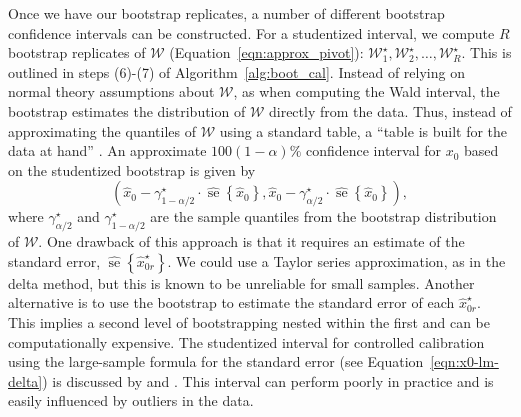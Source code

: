 \documentclass[cmfont,usenames,dvipsnames,leqno]{afit-etd}\usepackage[]{graphicx}\usepackage[]{color}
\newcommand{\boot}{\star} %
\newcommand{\mc}[1]{\ensuremath{\mathcal{#1}}}
\newcommand{\wh}[1]{\ensuremath{\widehat{#1}}}
\newcommand{\se}{\operatorname{se}}
\begin{document}
Once we have our bootstrap replicates, a number of different bootstrap confidence intervals can be constructed. For a studentized interval, we compute $R$ bootstrap replicates of $\mc{W}$ (Equation~\eqref{eqn:approx_pivot}): $\mc{W}_1^\boot, \mc{W}_2^\boot, \dotsc, \mc{W}_R^\boot$. This is outlined in steps (6)-(7) of Algorithm~\ref{alg:boot_cal}. Instead of relying on normal theory assumptions about $\mc{W}$, as when computing the Wald interval, the bootstrap estimates the distribution of $\mc{W}$ directly from the data. Thus, instead of approximating the quantiles of $\mc{W}$ using a standard table, a ``table is built for the data at hand'' \citep{efron_boot_1994}. An approximate $100(1 - \alpha)\%$ confidence interval for $x_0$ based on the studentized bootstrap is given by
\begin{equation}
\label{eqn:student_int}
  \left( \wh{x}_0 - \gamma_{1-\alpha/2}^\boot \cdot \wh{\se}\left\{\wh{x}_0\right\}, \wh{x}_0 - \gamma_{\alpha/2}^\boot \cdot \wh{\se}\left\{\wh{x}_0\right\} \right),
\end{equation}
where $\gamma_{\alpha/2}^\boot$ and $\gamma_{1 - \alpha/2}^\boot$ are the sample quantiles from the bootstrap distribution of $\mc{W}$. One drawback of this approach is that it requires an estimate of the standard error, $\wh{\se}\left\{\wh{x}_{0r}^\boot\right\}$. We could use a Taylor series approximation, as in the delta method, but this is known to be unreliable for small samples. Another alternative is to use the bootstrap to estimate the standard error of each $\wh{x}_{0r}^\boot$. This implies a second level of bootstrapping nested within the first and can be computationally expensive. The studentized interval for controlled calibration using the large-sample formula for the standard error (see Equation~\eqref{eqn:x0-lm-delta}) is discussed by \citet{zeng_bootstrap-adjusted_1997} and  \citet{jones_bootstrapping_1999}. This interval can perform poorly in practice and is easily influenced by outliers in the data. 
\end{document}
